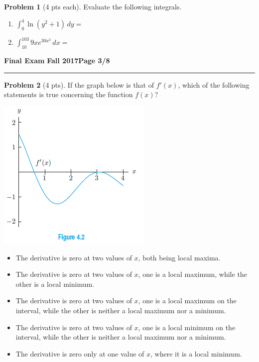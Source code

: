\documentclass[12pt]{article}
\makeatletter
\theoremstyle{definition}
\newtheorem{problem}{Problem}
\newcommand*{\radiobutton}{%
  \@ifstar{\@radiobutton0}{\@radiobutton1}%
}
\newcommand*{\@radiobutton}[1]{%
  \begin{tikzpicture}
    \pgfmathsetlengthmacro\radius{height("X")/2}
    \draw[radius=\radius] circle;
    \ifcase#1 \fill[radius=.6*\radius] circle;\fi
  \end{tikzpicture}%
}
\makeatother
\begin{document}
\begin{problem}[4 pts each]
Evaluate the following integrals.
\begin{enumerate}
\item $\displaystyle{\int_{0}^{4} \ln(y^2 + 1) \, dy} = $
\item $\displaystyle{\int_{10}^{103} 9xe^{30x^2}\, dx = }$
\vspace{7cm}
\end{enumerate}
\end{problem}

\newpage

\hfill{\large\bf Final Exam}\hfill{\large\bf
  Fall 2017}\hfill{\large\bf Page 3/8}\hrule

\bigskip

\begin{problem}[4 pts]
If the graph below is that of $f'(x)$, which of the following statements is true concerning the function $f(x)$?
\begin{multicols}{2}
\includegraphics{3graph2}
\vspace{2cm}

\begin{itemize}
\item[\radiobutton] The derivative is zero at two values of $x$, both being local maxima.
\item[\radiobutton] The derivative is zero at two values of $x$, one is a local maximum, while the other is a local minimum.
\item[\radiobutton] The derivative is zero at two values of $x$, one is a local maximum on the interval, while the other is neither a local maximum nor a minimum.
\item[\radiobutton] The derivative is zero at two values of $x$, one is a local minimum on the interval, while the other is neither a local maximum nor a minimum.
\item[\radiobutton] The derivative is zero only at one value of $x$, where it is a local minimum.
\end{itemize}
\end{multicols}
\end{problem}
\end{document}
